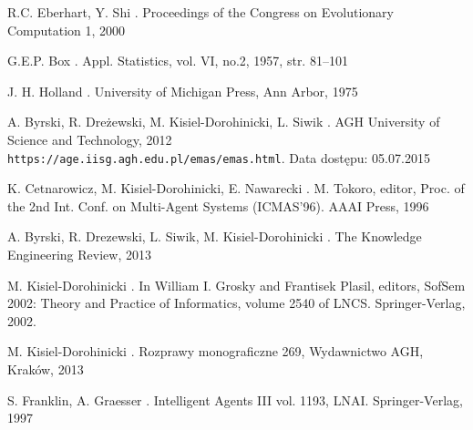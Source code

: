 \begin{thebibliography}{1}
R.C. Eberhart, Y. Shi
.
\newblock Proceedings of the Congress on Evolutionary Computation 1, 2000


G.E.P. Box 
.
\newblock Appl. Statistics, vol. VI, no.2, 1957, str. 81–101


J. H. Holland
.
\newblock  University of Michigan Press, Ann Arbor, 1975


A. Byrski, R. Dreżewski, M. Kisiel-Dorohinicki, L. Siwik
.
\newblock  AGH University of Science and Technology, 2012
\newblock \\\texttt{https://age.iisg.agh.edu.pl/emas/emas.html}.
\newblock Data dostępu: 05.07.2015


K. Cetnarowicz, M. Kisiel-Dorohinicki, E. Nawarecki
.
\newblock  M. Tokoro, editor, Proc. of the 2nd Int. Conf. on Multi-Agent Systems (ICMAS'96). AAAI Press, 1996


 A. Byrski, R. Drezewski, L. Siwik, M. Kisiel-Dorohinicki
.
\newblock The Knowledge Engineering Review, 2013


M. Kisiel-Dorohinicki
.
\newblock In William I. Grosky and Frantisek Plasil, editors, SofSem 2002: Theory and Practice of Informatics, volume 2540 of LNCS. Springer-Verlag, 2002.




M. Kisiel-Dorohinicki
.
\newblock Rozprawy monograficzne 269, Wydawnictwo AGH, Kraków, 2013


S. Franklin, A. Graesser
.
\newblock Intelligent Agents III vol. 1193, LNAI. Springer-Verlag, 1997



\end{thebibliography}
